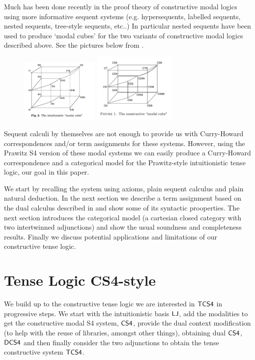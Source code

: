 \documentclass{article}
\begin{document}
Much has been done recently in the proof theory of constructive modal logics using more informative sequent systems (e.g. hypersequents, labelled sequents, nested sequents, tree-style sequents, etc..) In particular nested sequents have been used to produce `modal cubes' for the two variants of constructive modal logics described above. See the pictures below from \cite{arisaka2015,strasburger2013}.

\begin{figure}[h!]
\centering
\includegraphics[width=1.5in]{intmodalcube.pdf}
\includegraphics[width=1.6in]{constructivemodalcube.pdf}
\label{fig:modalcube}
\end{figure}

Sequent calculi  by themselves are not enough to provide us with Curry-Howard correspondences and/or term assignments for these systems. However, using the Prawitz S4 version of these modal systems we can easily produce a Curry-Howard correspondence and a categorical model for the Prawitz-style intuitionistic tense logic, our goal in this paper. 

We start by recalling the system using axioms, plain sequent calculus and plain natural deduction. In the next section we describe a term assignment based on the dual calculus described in \cite{icalp1998} and show some of its syntactic prooperties. The next section  introduces the categorical model (a cartesian closed category with two intertwinned adjunctions) and show the usual soundness and completeness results. Finally we discuss potential applications and  limitations of our constructive tense logic.

\section{Tense Logic CS4-style}
We build up to the constructive tense logic we are interested in $\sf{TCS4}$ in progressive steps. We start with the intuitionistic basis $\sf{LJ}$, add the modalities to get the constructive modal S4 system, $\sf{CS4}$, provide the dual context modification (to help with the reuse of libraries, amongst other things), obtaining dual $\sf{CS4}$, $\sf{DCS4}$ and then finally consider the two adjunctions to obtain the tense constructive system $\sf{TCS4}$.
\end{document}
